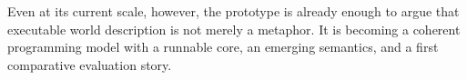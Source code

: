 \documentclass[sigplan,review,anonymous]{acmart}
\begin{document}
Even at its current scale, however, the prototype is already enough to argue that executable world description is not merely a metaphor.
It is becoming a coherent programming model with a runnable core, an emerging semantics, and a first comparative evaluation story.



\end{document}
